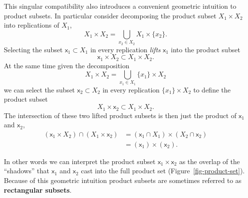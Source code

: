 \documentclass[
  letterpaper,
  DIV=11,
  numbers=noendperiod]{scrartcl}
\begin{document}
This singular compatibility also introduces a convenient geometric
intuition to product subsets. In particular consider decomposing the
product subset \(X_{1} \times X_{2}\) into replications of \(X_{1}\), \[
X_{1} \times X_{2} = \bigcup_{x_{2} \in X_{2}} X_{1} \times \{ x_{2} \}.
\] Selecting the subset \(\mathsf{x}_{1} \subset X_{1}\) in every
replication \emph{lifts} \(\mathsf{x}_{1}\) into the product subset \[
\mathsf{x}_{1} \times X_{2} \subset X_{1} \times X_{2}.
\] At the same time given the decomposition \[
X_{1} \times X_{2} = \bigcup_{x_{1} \in X_{1}} \{ x_{1} \} \times X_{2}
\] we can select the subset \(\mathsf{x}_{2} \subset X_{2}\) in every
replication \(\{ x_{1} \} \times X_{2}\) to define the product subset \[
X_{1} \times \mathsf{x}_{2} \subset X_{1} \times X_{2}.
\] The intersection of these two lifted product subsets is then just the
product of \(\mathsf{x}_{1}\) and \(\mathsf{x}_{2}\), \begin{align*}
(\mathsf{x}_{1} \times X_{2}) \cap (X_{1} \times \mathsf{x}_{2})
&=
(\mathsf{x}_{1} \cap X_{1}) \times (X_{2} \cap \mathsf{x}_{2})
\\
&=
(\mathsf{x}_{1}) \times (\mathsf{x}_{2}).
\end{align*}

In other words we can interpret the product subset
\(\mathsf{x}_{1} \times \mathsf{x}_{2}\) as the overlap of the
``shadows'' that \(\mathsf{x}_{1}\) and \(\mathsf{x}_{2}\) cast into the
full product set (Figure~\ref{fig-product-set}). Because of this
geometric intuition product subsets are sometimes referred to as
\textbf{rectangular subsets}.
\end{document}
